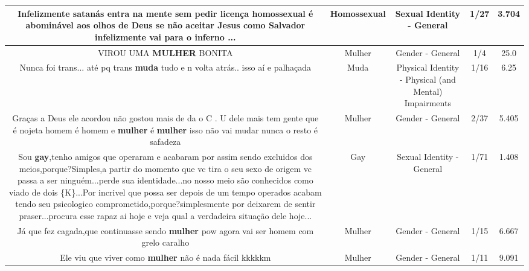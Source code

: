 \documentclass[11pt]{article}
\newlength\mylength
\begin{document}
\begin{center}
\begin{longtable}{|C{.65\mylength}|C{.30\mylength}|C{.12\mylength}|C{.12\mylength}|C{.12\mylength}|}
  \small Infelizmente satanás entra na mente sem pedir licença \textbf{homossexual} é abominável aos olhos de Deus se não aceitar Jesus como Salvador infelizmente vai para o inferno ...\normalsize   & Homossexual & Sexual Identity - General & 1/27 & 3.704 \\  \hline
  \small VIROU UMA \textbf{MULHER} BONITA\normalsize   & Mulher & Gender - General & 1/4 & 25.0 \\  \hline
  \small Nunca foi trans... até pq trans \textbf{muda} tudo e n volta atrás.. isso aí e palhaçada\normalsize   & Muda & Physical Identity - Physical (and Mental) Impairments & 1/16 & 6.25 \\  \hline
  \small Graças a Deus ele acordou não gostou mais de da  o C . U  dele mais tem gente que é nojeta homem é homem e \textbf{mulher} é \textbf{mulher} isso não vai mudar nunca o resto é safadeza\normalsize   & Mulher & Gender - General & 2/37 & 5.405 \\  \hline
  \small Sou \textbf{gay},tenho amigos que operaram e acabaram por assim sendo excluidos dos meios,porque?Simples,a partir do momento que vc tira o seu sexo de origem vc passa a ser ninguém...perde sua identidade...no nosso meio são conhecidos como viado de dois \{K\}...Por incrivel que possa ser depois de um tempo operados acabam tendo seu psicologico comprometido,porque?simplesmente por deixarem de sentir praser...procura esse rapaz ai hoje e veja qual a verdadeira situação dele hoje...\normalsize   & Gay & Sexual Identity - General & 1/71 & 1.408 \\  \hline
  \small Já que fez cagada,que continuasse sendo \textbf{mulher} pow agora vai ser homem com grelo caralho\normalsize   & Mulher & Gender - General & 1/15 & 6.667 \\  \hline
  \small Ele viu que viver como \textbf{mulher} não é nada fácil kkkkkm\normalsize   & Mulher & Gender - General & 1/11 & 9.091 \\  \hline

\end{longtable}
\end{center}
\end{document}
